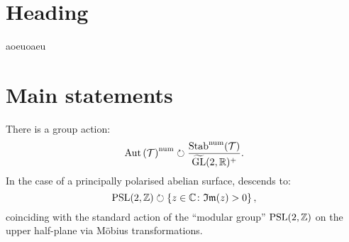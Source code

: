 \documentclass[]{article}
\newcommand{\gltworplustilde}{\widetilde{\mathrm{GL}}(2,\RR)}
\begin{document}
\maketitle
\tableofcontents

\section{Heading}
aoeuoaeu

\section{Main statements}

\begin{theorem}
	There is a group action:
	\[
		\aut\left(\triangcat\right)^{\mathrm{num}}
		\circlearrowright
		\frac{
			\stab^{\mathrm{num}}(\triangcat)
		}{
			\gltworplustilde^+
		}.
	\]
	\noindent
	In the case of a principally polarised abelian surface, descends to:
	\[
		\mathrm{PSL}(2, \mathbb{Z})
		\circlearrowright
		\left\{
		z \in \mathbb{C}
		\colon
		\mathfrak{Im}(z) > 0
		\right\},
	\]
	coinciding with the standard action of
	the ``modular group'' $\mathrm{PSL}(2, \mathbb{Z})$
	on the upper half-plane via Möbius transformations.
\end{theorem}
\end{document}
